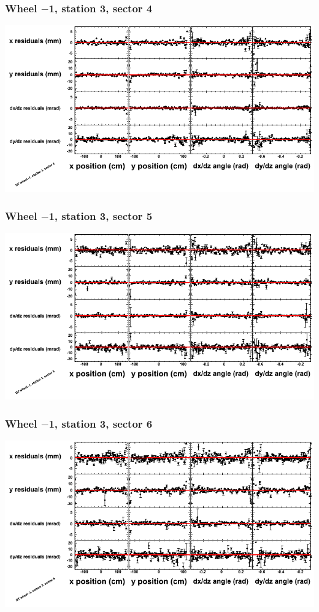 \documentclass[compress]{beamer}
\begin{document}
\begin{frame}
\frametitle{Wheel $-$1, station 3, sector 4}
\includegraphics[width=\linewidth]{tmppoly_MBwhBst3sec04.png}
\end{frame}

\begin{frame}
\frametitle{Wheel $-$1, station 3, sector 5}
\includegraphics[width=\linewidth]{tmppoly_MBwhBst3sec05.png}
\end{frame}

\begin{frame}
\frametitle{Wheel $-$1, station 3, sector 6}
\includegraphics[width=\linewidth]{tmppoly_MBwhBst3sec06.png}
\end{frame}
\end{document}
